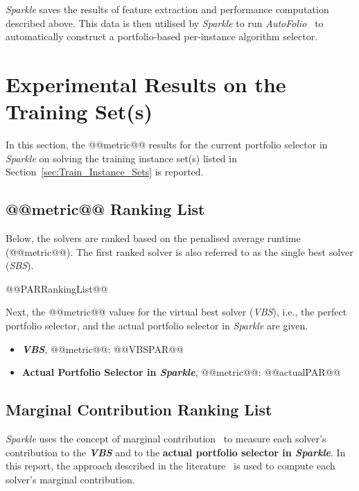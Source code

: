 \documentclass[british]{article}
\begin{document}
\emph{Sparkle} saves the results of feature extraction and performance computation described above. This data is then utilised by \emph{Sparkle} to run \emph{AutoFolio}~\cite{LinEtAl15} to automatically construct a portfolio-based per-instance algorithm selector.

\section{Experimental Results on the Training Set(s)}
\label{sec:Experimental_Results_Train}

In this section, the @@metric@@ results for the current portfolio selector in \emph{Sparkle} on solving the training instance set(s) listed in Section~\ref{sec:Train_Instance_Sets} is reported.

\subsection{@@metric@@ Ranking List}
\label{sec:PAR_Ranking}

Below, the solvers are ranked based on the penalised average runtime (@@metric@@). The first ranked solver is also referred to as the single best solver (\emph{SBS}).

\begin{enumerate}
@@PARRankingList@@
\end{enumerate}

Next, the @@metric@@ values for the virtual best solver (\emph{VBS}), i.e., the perfect portfolio selector, and the actual portfolio selector in \emph{Sparkle} are given.

\begin{itemize}
\item \textbf{\emph{VBS}}, @@metric@@: @@VBSPAR@@
\item \textbf{Actual Portfolio Selector in \emph{Sparkle}}, @@metric@@: @@actualPAR@@
\end{itemize}

\subsection{Marginal Contribution Ranking List}
\label{sec:Marginal_Contribution_Ranking}

\emph{Sparkle} uses the concept of marginal contribution~\cite{XuEtAl12} to measure each solver's contribution to the \textbf{\emph{VBS}} and to the \textbf{actual portfolio selector in \emph{Sparkle}}. In this report, the approach described in the literature~\cite{FreEtAl16} is used to compute each solver's marginal contribution.
\end{document}
